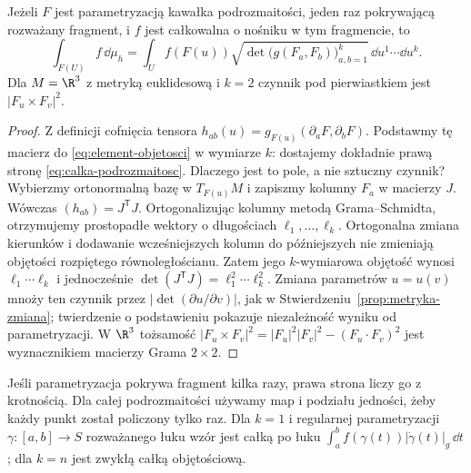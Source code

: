 \begin{twierdzenie}
\label{thm:calka-podrozmaitosc}
Jeżeli $F$ jest parametryzacją kawałka
podrozmaitości, jeden raz pokrywającą
rozważany fragment, i $f$ jest całkowalna
o nośniku w tym fragmencie, to
\begin{equation}\label{eq:calka-podrozmaitosc}
 \int_{F(U)}f\,\dd\mu_h
 =\int_U f(F(u))
   \sqrt{\det\bigl(g(F_a,F_b)\bigr)_{a,b=1}^k}
                      \,\dd u^1\cdots\dd u^k .
\end{equation}
Dla $M=\R^3$ z metryką euklidesową i $k=2$ czynnik pod pierwiastkiem
jest $|F_u\times F_v|^2$.
\end{twierdzenie}
\begin{proof}
Z definicji cofnięcia tensora
$h_{ab}(u)=g_{F(u)}(\partial_aF,\partial_bF)$.
Podstawmy tę macierz do
\eqref{eq:element-objetosci} w wymiarze $k$:
dostajemy dokładnie prawą stronę
\eqref{eq:calka-podrozmaitosc}.
Dlaczego jest to pole, a nie sztuczny czynnik?
Wybierzmy ortonormalną bazę w $T_{F(u)}M$
i zapiszmy kolumny $F_a$ w macierzy $J$.
Wówczas $(h_{ab})=J^{\mathsf T}J$.
Ortogonalizując kolumny metodą Grama--Schmidta,
otrzymujemy prostopadłe wektory o długościach
$\ell_1,\ldots,\ell_k$. Ortogonalna zmiana
kierunków i dodawanie wcześniejszych kolumn
do późniejszych nie zmieniają objętości
rozpiętego równoległościanu. Zatem jego
$k$-wymiarowa objętość wynosi
$\ell_1\cdots\ell_k$ i jednocześnie
$\det(J^{\mathsf T}J)=\ell_1^2\cdots\ell_k^2$.
Zmiana parametrów $u=u(v)$ mnoży ten czynnik
przez $|\det(\partial u/\partial v)|$,
jak w Stwierdzeniu~\ref{prop:metryka-zmiana};
twierdzenie o podstawieniu pokazuje
niezależność wyniku od parametryzacji.
W $\R^3$ tożsamość
$|F_u\times F_v|^2
=|F_u|^2|F_v|^2-(F_u\cdot F_v)^2$
jest wyznacznikiem macierzy Grama $2\times2$.
\end{proof}

Jeśli parametryzacja pokrywa fragment kilka
razy, prawa strona liczy go z krotnością.
Dla całej podrozmaitości używamy map
i podziału jedności, żeby każdy punkt
został policzony tylko raz. Dla $k=1$ i regularnej
parametryzacji $\gamma:[a,b]\to S$ rozważanego łuku
wzór jest całką po łuku
$\int_a^b f(\gamma(t))|\dot\gamma(t)|_g\,\dd t$;
dla $k=n$ jest zwykłą całką objętościową.

